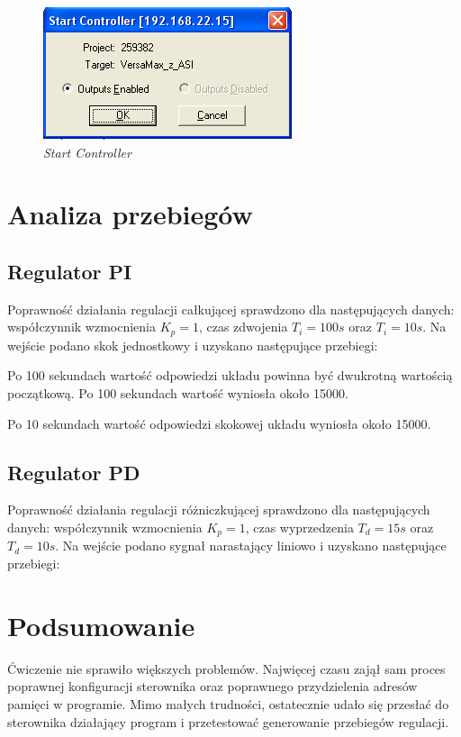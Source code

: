 \documentclass[12pt]{article}
\begin{document}
\begin{figure}[H]
    \centering
    \includegraphics[]{./zdj/start}
    \caption{\textit{Start Controller}}
    \label{start}
\end{figure}


\section{Analiza przebiegów}
\subsection{Regulator PI}
Poprawność działania regulacji całkującej sprawdzono dla następujących danych: współczynnik wzmocnienia $K_p=1$, czas zdwojenia $T_i = 100s$ oraz $T_i = 10s$. Na wejście podano skok jednostkowy i uzyskano następujące przebiegi:

Po 100 sekundach wartość odpowiedzi układu powinna być dwukrotną wartością początkową. Po 100 sekundach wartość wyniosła około 15000.


Po 10 sekundach wartość odpowiedzi skokowej układu wyniosła około 15000. 

\subsection{Regulator PD}
Poprawność działania regulacji różniczkującej sprawdzono dla następujących danych: współczynnik wzmocnienia $K_p=1$, czas wyprzedzenia $T_d = 15s$ oraz $T_d = 10s$. Na wejście podano sygnał narastający liniowo i uzyskano następujące przebiegi:


\section{Podsumowanie}
Ćwiczenie nie sprawiło większych problemów. Najwięcej czasu zajął sam proces poprawnej konfiguracji sterownika oraz poprawnego przydzielenia adresów pamięci w programie. Mimo małych trudności, ostatecznie udało się przesłać do sterownika działający program i przetestować generowanie przebiegów regulacji. 
\end{document}
